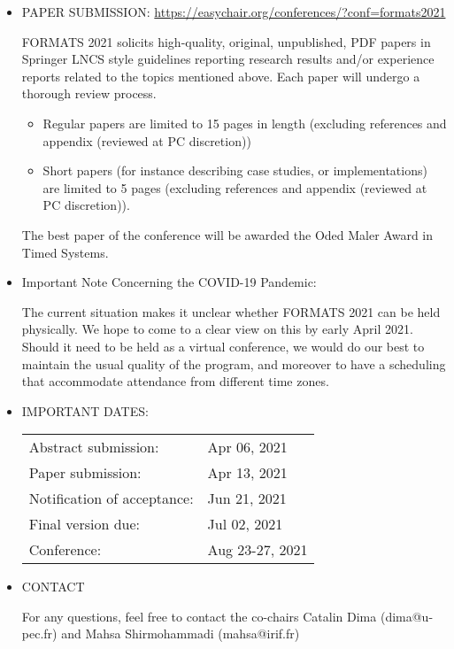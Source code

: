 \documentclass{article}
\begin{document}
\begin{itemize}
\item  PAPER SUBMISSION: \href{https://easychair.org/conferences/?conf=formats2021}{https://easychair.org/conferences/?conf=formats2021} 
 
  FORMATS 2021 solicits high-quality, original, unpublished, PDF papers in Springer LNCS style guidelines reporting research results and/or experience reports related to the topics mentioned above. Each paper will undergo a thorough review process. 
 
\begin{itemize}\item  Regular papers are limited to 15 pages in length (excluding references and appendix (reviewed at PC discretion))
\item  Short papers (for instance describing case studies, or implementations) are limited to 5 pages (excluding references and appendix (reviewed at PC discretion)).
\end{itemize} 
  The best paper of the conference will be awarded the Oded Maler Award in Timed Systems. 
 
\item  Important Note Concerning the COVID-19 Pandemic: 
 
    The current situation makes it unclear whether FORMATS 2021 can be held physically. We hope to come to a clear view on this by early April 2021. Should it need to be held as a virtual conference, we would do our best to maintain the usual quality of the program, and moreover to have a scheduling that accommodate attendance from different time zones.  
 
\item  IMPORTANT DATES: 
 
\begin{tabulary}{\linewidth}{LL}Abstract submission:  & Apr 06, 2021 \\
Paper submission:  & Apr 13, 2021 \\
Notification of acceptance:  & Jun 21, 2021 \\
Final version due:  & Jul 02, 2021 \\
Conference:  & Aug 23-27, 2021 \\
\end{tabulary}
 
\item  CONTACT 
 
  For any questions, feel free to contact the co-chairs Catalin Dima (dima@u-pec.fr) and Mahsa Shirmohammadi (mahsa@irif.fr) 
 

\end{itemize}
\end{document}

